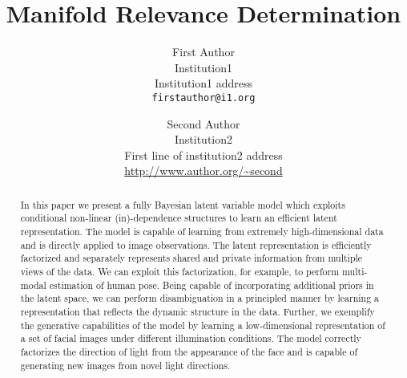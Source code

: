 \documentclass[10pt,twocolumn,letterpaper]{article}
\begin{document}
\newcommand{\highlight}[1]{\colorbox{yellow}{#1}}

\newcommand{\bff}{\mathbf{f}}
\newcommand{\bfu}{\mathbf{u}}
\newcommand{\bfy}{\mathbf{y}}
\newcommand{\bfx}{\mathbf{x}}
\newcommand{\bft}{\mathbf{t}}
\newcommand{\bfk}{\mathbf{k}}
\newcommand{\bfzi}{\mathbf{z}}
\newcommand{\bfw}{\mathbf{w}}
\newcommand{\bfmu}{\boldsymbol \mu}
\newcommand{\bfz}{\mathbf{0}}
\newcommand{\bftheta}{\boldsymbol \theta}

\newcommand{\T}{{\top}}

\newcommand{\bfa}{\mathbf{a}}
\newcommand{\bb}{\beta^{-1}}
\newcommand{\la}{\left\langle}
\newcommand{\ra}{\right\rangle}
\newcommand{\vv}{\vartheta}

\newcommand{\intd}{\text{d}}


\title{Manifold Relevance Determination}

\author{First Author\\
Institution1\\
Institution1 address\\
{\tt\small firstauthor@i1.org}
\and
Second Author\\
Institution2\\
First line of institution2 address\\
{\small\url{http://www.author.org/~second}}
}

\maketitle

\begin{abstract}
  In this paper we present a fully Bayesian latent variable model
  which exploits conditional non-linear (in)-dependence structures to
  learn an efficient latent representation. The model is capable of
  learning from extremely high-dimensional data and is directly
  applied to image observations. The latent representation is
  efficiently factorized and separately represents shared and private
  information from multiple views of the data. We can exploit this
  factorization, for example, to perform multi-modal estimation of human
  pose. Being capable of incorporating additional priors in the latent space, we can 
  perform disambiguation in a
  principled manner by learning a
  representation that reflects the dynamic structure in the
  data. Further, we exemplify the generative capabilities of the model
  by learning a low-dimensional representation of a set of facial
  images under different illumination conditions. The model correctly
  factorizes the direction of light from the appearance of the face
  and is capable of generating new images from novel light directions.
\end{abstract}
\end{document}
